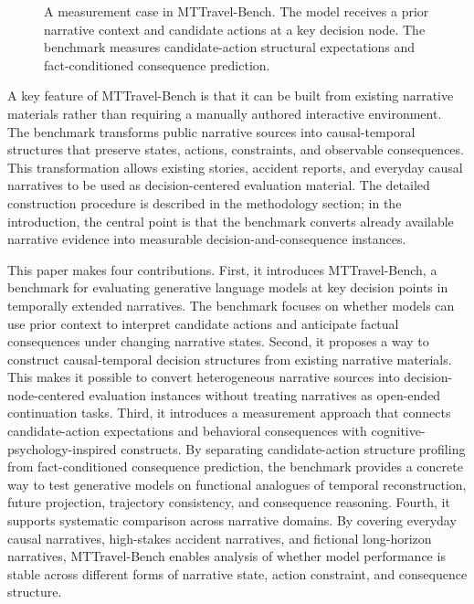 \documentclass[pdflatex,sn-mathphys-num]{sn-jnl}%
\theoremstyle{thmstyleone}%
\theoremstyle{thmstyletwo}%
\theoremstyle{thmstylethree}%
\begin{document}
\begin{figure}[htbp]
\centering
{}
\caption{A measurement case in MTTravel-Bench. The model receives a prior narrative context and candidate actions at a key decision node. The benchmark measures candidate-action structural expectations and fact-conditioned consequence prediction.}
\label{fig:measurement-case}
\end{figure}
A key feature of MTTravel-Bench is that it can be built from existing narrative materials rather than requiring a manually authored interactive environment. The benchmark transforms public narrative sources into causal-temporal structures that preserve states, actions, constraints, and observable consequences. This transformation allows existing stories, accident reports, and everyday causal narratives to be used as decision-centered evaluation material. The detailed construction procedure is described in the methodology section; in the introduction, the central point is that the benchmark converts already available narrative evidence into measurable decision-and-consequence instances.

This paper makes four contributions. First, it introduces MTTravel-Bench, a benchmark for evaluating generative language models at key decision points in temporally extended narratives. The benchmark focuses on whether models can use prior context to interpret candidate actions and anticipate factual consequences under changing narrative states. Second, it proposes a way to construct causal-temporal decision structures from existing narrative materials. This makes it possible to convert heterogeneous narrative sources into decision-node-centered evaluation instances without treating narratives as open-ended continuation tasks. Third, it introduces a measurement approach that connects candidate-action expectations and behavioral consequences with cognitive-psychology-inspired constructs. By separating candidate-action structure profiling from fact-conditioned consequence prediction, the benchmark provides a concrete way to test generative models on functional analogues of temporal reconstruction, future projection, trajectory consistency, and consequence reasoning. Fourth, it supports systematic comparison across narrative domains. By covering everyday causal narratives, high-stakes accident narratives, and fictional long-horizon narratives, MTTravel-Bench enables analysis of whether model performance is stable across different forms of narrative state, action constraint, and consequence structure.
\end{document}
